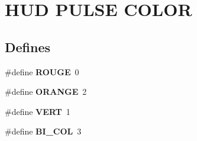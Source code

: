 \hypertarget{group__group4}{
\section{HUD PULSE COLOR}
\label{group__group4}
}
\subsection*{Defines}
\begin{DoxyCompactItemize}
\item 
\hypertarget{group__group4_ga358a59dd21062085dd34d5c228c5f136}{
\#define {\bfseries ROUGE}~0}
\label{group__group4_ga358a59dd21062085dd34d5c228c5f136}

\item 
\hypertarget{group__group4_gac5b6e19bf06822021f35602c59658de3}{
\#define {\bfseries ORANGE}~2}
\label{group__group4_gac5b6e19bf06822021f35602c59658de3}

\item 
\hypertarget{group__group4_ga22c2b7cb14b1ffb516a9ed4a164b5cda}{
\#define {\bfseries VERT}~1}
\label{group__group4_ga22c2b7cb14b1ffb516a9ed4a164b5cda}

\item 
\hypertarget{group__group4_ga56e062981f5fbdab39e0c1c6b34f626c}{
\#define {\bfseries BI\_\-COL}~3}
\label{group__group4_ga56e062981f5fbdab39e0c1c6b34f626c}

\end{DoxyCompactItemize}
